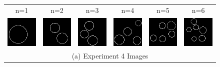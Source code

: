 \documentclass[letterpaper]{article} %
\begin{document}
\begin{figure}[!htbp]%
\centering
\footnotesize 
\begin{tabular}{cccccc}
\multicolumn{1}{c}{n=1} \hspace{-12pt} &  
\multicolumn{1}{c}{n=2} \hspace{-12pt} & 
\multicolumn{1}{c}{n=3} \hspace{-12pt} & 
\multicolumn{1}{c}{n=4} \hspace{-12pt} & 
\multicolumn{1}{c}{n=5} \hspace{-12pt} & 
\multicolumn{1}{c}{n=6} \\

\multicolumn{1}{c}{\includegraphics[width=0.125\columnwidth]{images/ring_1.png}} \hspace{-12pt} &  \multicolumn{1}{c}{\includegraphics[width=0.125\columnwidth]{images/ring_2.png}} \hspace{-12pt} & \multicolumn{1}{c}{\includegraphics[width=0.125\columnwidth]{images/ring_3.png}} \hspace{-12pt} & \multicolumn{1}{c}{\includegraphics[width=0.125\columnwidth]{images/ring_4.png}} \hspace{-12pt} & \multicolumn{1}{c}{\includegraphics[width=0.125\columnwidth]{images/ring_5.png}} \hspace{-12pt} & \multicolumn{1}{c}{\includegraphics[width=0.125\columnwidth]{images/ring_6.png}} \\ 
\multicolumn{6}{c}{(a) Experiment 4 Images} \\


\end{tabular}
\end{figure}
\end{document}
